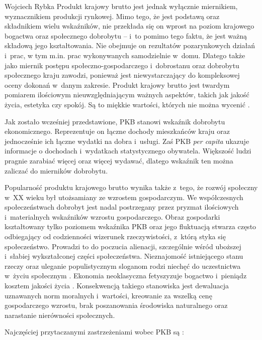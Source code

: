 \begin{artplenv}{Wojciech Rybka}
Produkt krajowy brutto jest jednak wyłącznie miernikiem, wyznacznikiem produkcji rynkowej. Mimo tego, że jest podstawą
oraz składnikiem wielu wskaźników, nie przekłada się on wprost na poziom krajowego bogactwa oraz społecznego
dobrobytu -- i~to pomimo tego faktu, że jest ważną składową jego kształtowania. Nie obejmuje on rezultatów pozarynkowych działań i~prac,
w tym m.in. prac wykonywanych samodzielnie w~domu. Dlatego także jako miernik postępu
społeczno-gospodarczego i~dobrostanu oraz dobrobytu społecznego kraju zawodzi, ponieważ
jest niewystarczający do kompleksowej oceny dokonań w~danym zakresie.
Produkt krajowy brutto jest twardym pomiarem ilościowym nieuwzględniającym ważnych aspektów, takich jak
jakość życia, estetyka czy spokój. Są to miękkie wartości, których nie można wycenić
\parencite{dickinson_gdp:_2011}.

Jak zostało wcześniej przedstawione, PKB stanowi wskaźnik dobrobytu ekonomicznego. Reprezentuje on łączne dochody
mieszkańców kraju oraz jednocześnie ich łączne wydatki na dobra i~usługi. Zaś PKB \textit{per capita} ukazuje informacje o
dochodach i~wydatkach statystycznego obywatela. Większość ludzi pragnie zarabiać więcej oraz więcej wydawać, dlatego
wskaźnik ten można zaliczać do mierników dobrobytu.

Popularność produktu krajowego brutto wynika także z~tego, że rozwój społeczny w~XX wieku był utożsamiany ze wzrostem
gospodarczym. We współczesnych społeczeństwach dobrobyt jest nadal postrzegany przez pryzmat ilościowych i~materialnych
wskaźników wzrostu gospodarczego. Obraz gospodarki kształtowany tylko poziomem wskaźnika PKB oraz jego fluktuacją
stwarza często odbiegający od codzienności wizerunek rzeczywistości, z~którą styka się społeczeństwo. Prowadzi to do
poczucia alienacji, szczególnie wśród uboższej i~słabiej wykształconej części społeczeństwa. Nieznajomość istniejącego
stanu rzeczy oraz uleganie populistycznym sloganom rodzi niechęć do uczestnictwa w~życiu społecznym
\parencite{dickinson_gdp:_2011}.
Ekonomia neoklasyczna fetyszyzuje bogactwo i~pieniądz kosztem jakości życia
\parencite{samuelson_ekonomia._2008}.
Konsekwencją takiego stanowiska jest dewaluacja uznawanych norm
moralnych i~wartości, kreowanie za wszelką cenę gospodarczego wzrostu, brak poszanowania środowiska naturalnego oraz
narastanie nierówności społecznych. 

Najczęściej przytaczanymi zastrzeżeniami wobec PKB są
\parencite{stiglitz_blad_2013}:


\end{artplenv}
